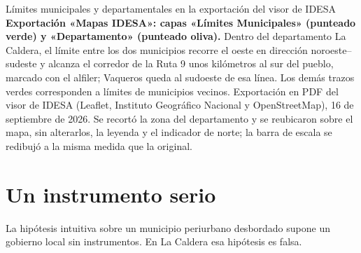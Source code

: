 %
{Límites municipales y departamentales en la exportación del visor de IDESA}%
{\textbf{Exportación «Mapas IDESA»: capas «Límites Municipales» (punteado verde) y «Departamento» (punteado oliva).} Dentro del departamento La Caldera, el límite entre los dos municipios recorre el oeste en dirección noroeste--sudeste y alcanza el corredor de la Ruta 9 unos kilómetros al sur del pueblo, marcado con el alfiler; Vaqueros queda al sudoeste de esa línea. Los demás trazos verdes corresponden a límites de municipios vecinos.}%
{Exportación en PDF del visor de IDESA (Leaflet, Instituto Geográfico Nacional y OpenStreetMap), 16 de septiembre de 2026. Se recortó la zona del departamento y se reubicaron sobre el mapa, sin alterarlos, la leyenda y el indicador de norte; la barra de escala se redibujó a la misma medida que la original.}

\section{Un instrumento serio}

La hipótesis intuitiva sobre un municipio periurbano desbordado supone un gobierno local sin instrumentos. En La Caldera esa hipótesis es falsa.

